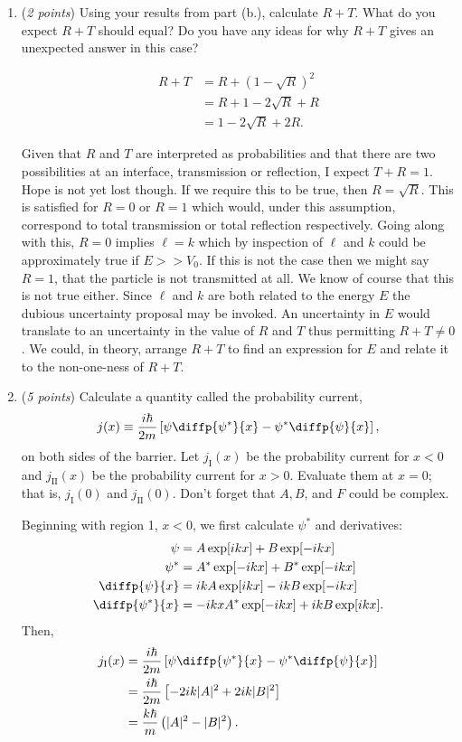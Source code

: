 \documentclass[a4paper, 12pt]{config/homework}
\begin{document}
\begin{enumerate}[label=(\alph*.)]
\vspace{\baselineskip}
\item (\textit{2 points}) Using your results from part (b.), calculate \(R+T\). What do you expect \(R+T\) should equal? Do you have any ideas for why \(R+T\) gives an unexpected answer in this case?

\begin{align*}
R + T &= R + \left( 1 - \sqrt{R} \right)^2
\\&= R + 1 - 2\sqrt{R} + R
\\&= 1 - 2\sqrt{R} + 2R.
\end{align*}

Given that \(R\) and \(T\) are interpreted as probabilities and that there are two possibilities at an interface, transmission or reflection, I expect \(T+R=1\). Hope is not yet lost though. If we require this to be true, then \(R = \sqrt{R}.\)
This is satisfied for \(R=0\) or \(R=1\) which would, under this assumption, correspond to total transmission or total reflection respectively. Going along with this, \(R=0\) implies \(\ell=k\) which by inspection of \(\ell \) and \(k\) could be approximately true if \(E >> V_0\). If this is not the case then we might say \(R=1\), that the particle is not transmitted at all. We know of course that this is not true either. Since \(\ell \) and \(k\) are both related to the energy \(E\) the dubious uncertainty proposal may be invoked. An uncertainty in \(E\) would translate to an uncertainty in the value of \(R\) and \(T\) thus permitting \(R+T\ne 0\). We could, in theory, arrange \(R+T\) to find an expression for \(E\) and relate it to the non-one-ness of \(R+T\).

\vspace{\baselineskip}
\item (\textit{5 points}) Calculate a quantity called the probability current,
\[j(x) \equiv \frac{i\hbar}{2m}\left[\psi\diffp{\psi^*}{x} - \psi^*\diffp{\psi}{x}\right],\]
on both sides of the barrier. Let \(j_\text{I}(x)\) be the probability current for \(x<0\) and \(j_\text{II}(x)\) be the probability current for \(x>0\). Evaluate them at \(x=0\); that is, \(j_\text{I}(0)\) and \(j_\text{II}(0)\). Don't forget that \(A,B\), and \(F\) could be complex.

Beginning with region 1, \(x<0\), we first calculate \(\psi^*\) and derivatives:
\begin{align*}
\psi &= A\exp[ikx] + B\exp[-ikx] \\
\psi^* &= A^*\exp[-ikx] + B^*\exp[-ikx] \\
\diffp{\psi}{x} &= ikA\exp[ikx] - ikB\exp[-ikx] \\
\diffp{\psi^*}{x} &= -ikxA^*\exp[-ikx] + ikB\exp[ikx].
\end{align*}
Then,
\begin{align*}
j_\text{I}(x) &= \frac{i\hbar}{2m}\left[\psi\diffp{\psi^*}{x} - \psi^*\diffp{\psi}{x}\right]
\\&= \frac{i\hbar}{2m}\left[-2ik|A|^2 + 2ik|B|^2\right]
\\&= \frac{k\hbar}{m}\left(|A|^2 - |B|^2\right).
\end{align*}


\end{enumerate}
\end{document}
